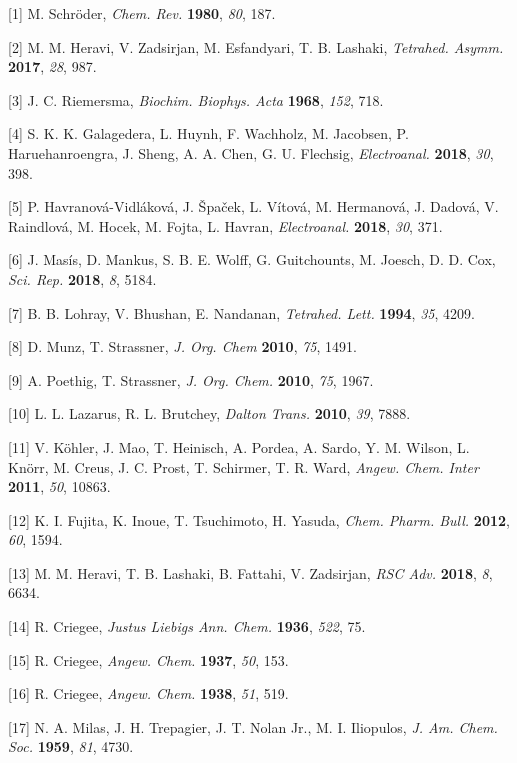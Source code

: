 \documentclass{article}
\begin{document}
\begin{hangpars}\small
[1] M. Schröder, \emph{Chem. Rev.} \textbf{1980}, \emph{80}, 187.

[2] M. M. Heravi, V. Zadsirjan, M. Esfandyari, T. B. Lashaki, \emph{Tetrahed. Asymm.} \textbf{2017}, \emph{28}, 987.

[3] J. C. Riemersma, \emph{Biochim. Biophys. Acta} \textbf{1968}, \emph{152}, 718.

[4] S. K. K. Galagedera, L. Huynh, F. Wachholz, M. Jacobsen, P. Haruehanroengra, J. Sheng, A. A. Chen, G. U. Flechsig, \emph{Electroanal.} \textbf{2018}, \emph{30}, 398.

[5] P. Havranová-Vidláková, J. Špaček, L. Vítová, M. Hermanová, J. Dadová, V. Raindlová, M. Hocek, M. Fojta, L. Havran, \emph{Electroanal.} \textbf{2018}, \emph{30}, 371.

[6] J. Masís, D. Mankus, S. B. E. Wolff, G. Guitchounts, M. Joesch, D. D. Cox, \emph{Sci. Rep.} \textbf{2018}, \emph{8}, 5184.

[7] B. B. Lohray, V. Bhushan, E. Nandanan, \emph{Tetrahed. Lett.} \textbf{1994}, \emph{35}, 4209.

[8] D. Munz, T. Strassner, \emph{J. Org. Chem} \textbf{2010}, \emph{75}, 1491.

[9] A. Poethig, T. Strassner, \emph{J. Org. Chem.} \textbf{2010}, \emph{75}, 1967.

[10] L. L. Lazarus, R. L. Brutchey, \emph{Dalton Trans.} \textbf{2010}, \emph{39}, 7888.

[11] V. Köhler, J. Mao, T. Heinisch, A. Pordea, A. Sardo, Y. M. Wilson, L. Knörr, M. Creus, J. C. Prost, T. Schirmer, T. R. Ward, \emph{Angew. Chem. Inter} \textbf{2011}, \emph{50}, 10863.

[12] K. I. Fujita, K. Inoue, T. Tsuchimoto, H. Yasuda, \emph{Chem. Pharm. Bull.} \textbf{2012}, \emph{60}, 1594.

[13] M. M. Heravi, T. B. Lashaki, B. Fattahi, V. Zadsirjan, \emph{RSC Adv.} \textbf{2018}, \emph{8}, 6634.

[14] R. Criegee, \emph{Justus Liebigs Ann. Chem.} \textbf{1936}, \emph{522}, 75.

[15] R. Criegee, \emph{Angew. Chem.} \textbf{1937}, \emph{50}, 153.

[16] R. Criegee, \emph{Angew. Chem.} \textbf{1938}, \emph{51}, 519.

[17] N. A. Milas, J. H. Trepagier, J. T. Nolan Jr., M. I. Iliopulos, \emph{J. Am. Chem. Soc.} \textbf{1959}, \emph{81}, 4730.


\end{hangpars}
\end{document}
